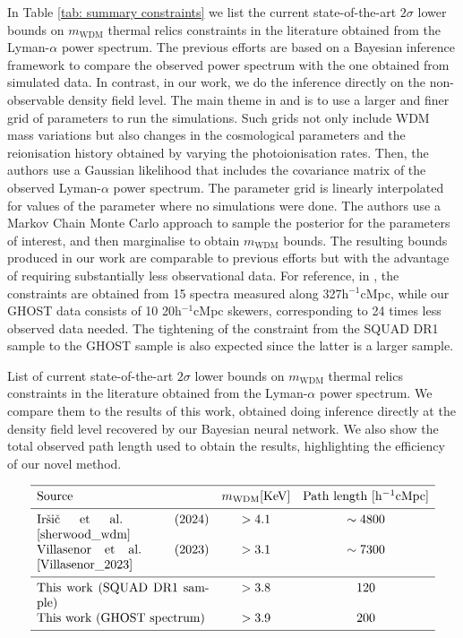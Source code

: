 In Table \ref{tab: summary constraints} we list the current state-of-the-art $2\sigma$ lower bounds on $m_{\mathrm{WDM}}$ thermal relics constraints in the literature obtained from the Lyman-$\alpha$ power spectrum. The previous efforts are based on a Bayesian inference framework to compare the observed power spectrum with the one obtained from simulated data. In contrast, in our work, we do the inference directly on the non-observable density field level. The main theme in \cite{sherwood_wdm} and \cite{Villasenor_2023} is to use a larger and finer grid of parameters to run the simulations. Such grids not only include WDM mass variations but also changes in the cosmological parameters and the reionisation history obtained by varying the photoionisation rates. Then, the authors use a Gaussian likelihood that includes the covariance matrix of the observed Lyman-$\alpha$ power spectrum. The parameter grid is linearly interpolated for values of the parameter where no simulations were done. The authors use a Markov Chain Monte Carlo approach to sample the posterior for the parameters of interest, and then marginalise to obtain $m_\mathrm{WDM}$ bounds.
The resulting bounds produced in our work are comparable to previous efforts but with the advantage of requiring substantially less observational data. For reference, in \cite{sherwood_wdm}, the constraints are obtained from 15 spectra measured along 327h$^{-1}$cMpc, while our GHOST data consists of 10 20h$^{-1}$cMpc skewers, corresponding to 24 times less observed data needed. The tightening of the constraint from the SQUAD DR1 sample to the GHOST sample is also expected since the latter is a larger sample.
\begin{table}[ht!]
    \caption[]{List of current state-of-the-art $2\sigma$ lower bounds on $m_{\mathrm{WDM}}$ thermal relics constraints in the literature obtained from the Lyman-$\alpha$ power spectrum. We compare them to the results of this work, obtained doing inference directly at the density field level recovered by our Bayesian neural network. We also show the total observed path length used to obtain the results, highlighting the efficiency of our novel method.}
       \label{tab: summary constraints}
   $$ 
       \begin{array}{p{0.4\textwidth}cc}
          \hline
          \noalign{\smallskip}
          Source &  m_{\mathrm{WDM}} \mathrm{[KeV]} & \mathrm{Path\ length} \ [\mathrm{h}^{-1}\mathrm{cMpc}] \\ 
          \noalign{\smallskip}
          \hline
          \noalign{\smallskip}
          Ir\v{s}i\v{c} et al. (2024) \cite{sherwood_wdm} & >4.1  & \sim 4800     \\
          Villasenor et al. (2023) \cite{Villasenor_2023} & >3.1  & \sim 7300    \\
          \noalign{\smallskip}
          \hline
          \noalign{\smallskip}
          This work (SQUAD DR1 sample)  & >3.8  & 120 \\
          This work (GHOST spectrum)  & >3.9    & 200    \\

          \noalign{\smallskip}
          \hline
       \end{array}
   $$ 
 \end{table}

